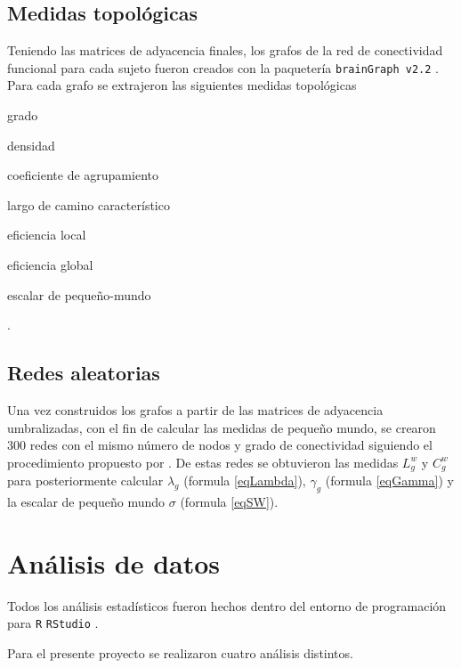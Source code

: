 \subsection{Medidas topológicas}
Teniendo las matrices de adyacencia finales, los grafos de la red de conectividad funcional para cada sujeto fueron creados con la paquetería \texttt{brainGraph v2.2} \parencite{Watson2018}. Para cada grafo se extrajeron las siguientes medidas topológicas
\begin{enumerate*}[label=\emph{\alph*}), before=\unskip{: }, itemjoin={{; }}, itemjoin*={{, y }}]
    \item grado
    \item densidad
    \item coeficiente de agrupamiento
    \item largo de camino característico
    \item eficiencia local
    \item eficiencia global
    \item escalar de pequeño-mundo
\end{enumerate*}.

\subsection{Redes aleatorias}
Una vez construidos los grafos a partir de las matrices de adyacencia umbralizadas, con el fin de calcular las medidas de pequeño mundo, se crearon 300 redes con el mismo número de nodos y grado de conectividad siguiendo el procedimiento propuesto por \textcite{Maslov2002}. De estas redes se obtuvieron las medidas $L^w_g$ y $C^w_g$ para posteriormente calcular $\lambda_g$ (formula \ref{eqLambda}), $\gamma_g$ (formula \ref{eqGamma}) y la escalar de pequeño mundo $\sigma$ (formula \ref{eqSW}).

\section{Análisis de datos}
Todos los análisis estadísticos fueron hechos dentro del entorno de programación para \texttt{R} \texttt{RStudio} \parencite{Rstudio2018}.

Para el presente proyecto se realizaron cuatro análisis distintos.

